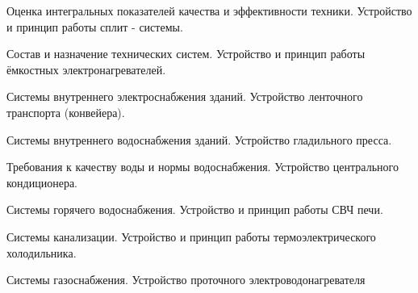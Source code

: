 \documentclass[
	14pt,
	a4paper,
	]
	{scrartcl}
\begin{document}
\vfill
\z Оценка интегральных показателей качества и эффективности техники.
 \vfill
\z Устройство и принцип работы сплит - системы.
 \vfill

\vfill

\newpage


\shapk
{}
\setcounter{zad}{0}

\vfill
\z Состав и назначение технических систем.
 \vfill
\z Устройство и принцип работы ёмкостных электронагревателей.
 \vfill

\vfill

\newpage


\shapk
{}
\setcounter{zad}{0}

\vfill
\z Системы внутреннего электроснабжения зданий.
 \vfill
\z Устройство ленточного транспорта (конвейера).
 \vfill

\vfill

\newpage


\shapk
{}
\setcounter{zad}{0}

\vfill
\z Системы внутреннего водоснабжения зданий.
 \vfill
\z Устройство гладильного пресса.
 \vfill

\vfill

\newpage


\shapk
{}
\setcounter{zad}{0}

\vfill
\z Требования к качеству воды и нормы водоснабжения.
 \vfill
\z Устройство центрального кондиционера.
 \vfill

\vfill

\newpage


\shapk
{}
\setcounter{zad}{0}

\vfill
\z Системы горячего водоснабжения.
 \vfill
\z Устройство и принцип работы СВЧ печи.
 \vfill

\vfill

\newpage


\shapk
{}
\setcounter{zad}{0}

\vfill
\z Системы канализации.
 \vfill
\z Устройство и принцип работы термоэлектрического холодильника.
 \vfill

\vfill

\newpage


\shapk
{}
\setcounter{zad}{0}

\vfill
\z Системы газоснабжения.
 \vfill
\z Устройство проточного электроводонагревателя
 \vfill
\end{document}
